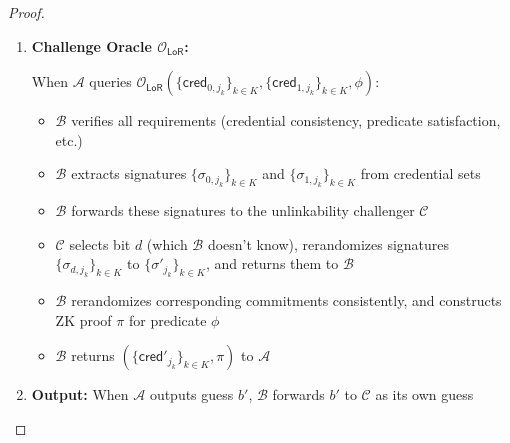 \begin{proof}
\begin{enumerate}
\begin{itemize}
        \item $\mathcal{O}_{\mathsf{Obtain}}(i, j, \vec{m})$: $\mathcal{B}$ computes commitment $\cm_{i,j} \gets \mathsf{CM.Com}(\vec{m}; r_{i,j})$ and obtains signature $\sigma_{i,j}$ from $\mathcal{C}$ for honest user $i$
        
        \item $\mathcal{O}_{\mathsf{Show}}(i, \{\mathsf{cred}_{j_k}\}_{k \in K}, \phi)$: $\mathcal{B}$ rerandomizes credentials, constructs proof $\pi$, and returns $(\{\mathsf{cred}'_{j_k}\}_{k \in K}, \pi)$
    \end{itemize}

    \item \textbf{Challenge Oracle $\mathcal{O}_{\mathsf{LoR}}$:}
    
    When $\mathcal{A}$ queries $\mathcal{O}_{\mathsf{LoR}}(\{\mathsf{cred}_{0,j_k}\}_{k \in K}, \{\mathsf{cred}_{1,j_k}\}_{k \in K}, \phi)$:
    \begin{itemize}
        \item $\mathcal{B}$ verifies all requirements (credential consistency, predicate satisfaction, etc.)
        
        \item $\mathcal{B}$ extracts signatures $\{\sigma_{0,j_k}\}_{k \in K}$ and $\{\sigma_{1,j_k}\}_{k \in K}$ from credential sets
        
        \item $\mathcal{B}$ forwards these signatures to the unlinkability challenger $\mathcal{C}$
        
        \item $\mathcal{C}$ selects bit $d$ (which $\mathcal{B}$ doesn't know), rerandomizes signatures $\{\sigma_{d,j_k}\}_{k \in K}$ to $\{\sigma'_{j_k}\}_{k \in K}$, and returns them to $\mathcal{B}$
        
        \item $\mathcal{B}$ rerandomizes corresponding commitments consistently, and constructs ZK proof $\pi$ for predicate $\phi$
        
        \item $\mathcal{B}$ returns $(\{\mathsf{cred}'_{j_k}\}_{k \in K}, \pi)$ to $\mathcal{A}$
    \end{itemize}

    \item \textbf{Output:} When $\mathcal{A}$ outputs guess $b'$, $\mathcal{B}$ forwards $b'$ to $\mathcal{C}$ as its own guess
\end{enumerate}


\end{proof}
